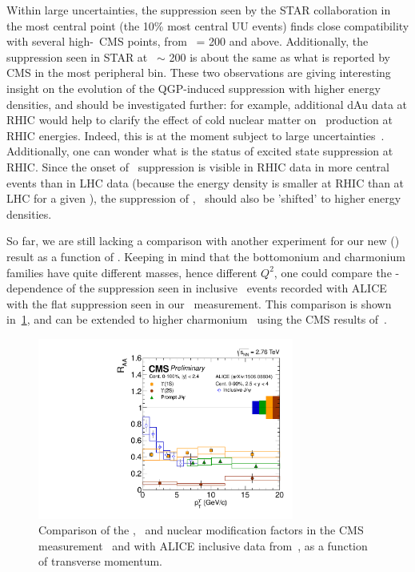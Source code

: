  Within large uncertainties, the
 suppression seen by the STAR collaboration in the most central point
 (the 10\% most central UU events) finds close compatibility with
 several high-\Npart\ CMS points, from \Npart\ = 200 and
 above. Additionally, the suppression seen in 
 STAR at \Npart~$\sim$ 200 is about the same as what is reported by CMS in
 the most peripheral bin. These two observations are giving
 interesting insight on the evolution of the QGP-induced suppression with
 higher energy densities, and should be investigated further: for
 example, additional dAu data at RHIC would help to clarify the effect of
 cold nuclear matter on \PgU\ production at RHIC energies. Indeed,
 this is at the moment subject to large
 uncertainties~\cite{Adamczyk:2013poh}. Additionally, one can wonder
 what is the status of
 excited state suppression at RHIC. Since the onset of \PgUa\
 suppression is visible in RHIC data in more central events than in
 LHC data (because the energy density is smaller at RHIC than at LHC
 for a given \Npart), the suppression of \PgUb, \PgUc\ should also be
 'shifted' to higher energy densities.


So far, we are still lacking a comparison with another experiment for
our new \RAA(\PgU) result as a function of \pt. Keeping in mind that
the bottomonium and charmonium families have quite different masses,
hence different $Q^{2}$, one could compare the \pt-dependence of the
suppression seen in inclusive \Jpsi\ events recorded with
ALICE~\cite{jpsiALICE} with the flat suppression seen in our \PgU\
measurement. This comparison is shown
in~\ref{fig:ALICE_CMS_pt_psi_HIN12014}, and can be extended to higher
charmonium \pt\ using the CMS results of~\cite{12014}.


\begin{figure}[h]
  \begin{centering}  
    \includegraphics[width=0.75\textwidth]{Chapters/aUpsilon/ALICE_CMS_pt_psi_HIN12014.pdf}
    \caption{Comparison of the \PgUa, \PgUb\ and \Jpsi nuclear modification factors in the CMS measurement~\cite{12014} and
      with ALICE inclusive \Jpsi data from~\cite{jpsiALICE}, as a function of transverse momentum.}
    \label{fig:ALICE_CMS_pt_psi_HIN12014}
  \end{centering}  
\end{figure}


